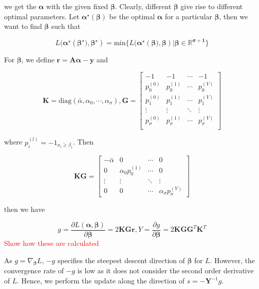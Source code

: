 we get the $\boldsymbol{\alpha}$ with the given fixed $\boldsymbol{\beta}$. Clearly, different $\boldsymbol{\beta}$ give rise to different optimal parameters. Let $\boldsymbol{\alpha^\star}(\boldsymbol{\beta})$ be the optimal $\boldsymbol{\alpha}$ for a particular $\boldsymbol{\beta}$, then we want to find $\boldsymbol{\beta}$ such that


\begin{equation}
	L(\boldsymbol{\alpha^\star}(\boldsymbol{\beta^\star)}, \boldsymbol{\beta^\star})=\text{min}\{L(\boldsymbol{\alpha^\star}(\boldsymbol{\beta)}, \boldsymbol{\beta}) | \boldsymbol{\beta\in\mathbb{R}^{\sigma+1}}\}
\end{equation}

For $\boldsymbol{\beta}$, we define $\boldsymbol{r}=\boldsymbol{A\alpha-y}$ and 

$$
\boldsymbol{K}=\text{diag}(\bar{\alpha},\alpha_0, \cdots, \alpha_\sigma), \boldsymbol{G}=\begin{bmatrix}
 -1 & -1 & \cdots & -1 \\
  p_0^{(0)} & p_0^{(1)} & \cdots & p_0^{(V)} \\
  p_1^{(0)} & p_1^{(1)} & \cdots & p_1^{(V)} \\
  \vdots & \vdots & \ddots & \vdots \\
  p_\sigma^{(0)} & p_\sigma^{(1)}& \cdots & p_\sigma^{(V)} \\
\end{bmatrix}
$$

where $p_i^{(l)}=-1_{x_l\geq \beta_i}$. Then

$$
\boldsymbol{KG}=\begin{bmatrix}
 -\bar{\alpha} & 0 & \cdots & 0 \\
 0 & \alpha_0p_0^{(1)} & \cdots  & 0 \\
 \vdots & \vdots & \ddots & \vdots \\
 0 & 0 & \cdots & \alpha_\sigma p_\sigma^{(V)}
\end{bmatrix}
$$

then we have 

\begin{equation}
	g=\frac{\partial L(\boldsymbol{\alpha},\boldsymbol{\beta})}{\partial \boldsymbol{\beta}}=2\boldsymbol{KGr},
	Y=\frac{\partial g}{\partial \boldsymbol{\beta}}=2\boldsymbol{KGG}^T \boldsymbol{K}^T
\end{equation}
\textcolor{red}{Show how these are calculated}

As $g=\nabla_{\boldsymbol{\beta}} L$, $-g$ specifies the steepest descent direction of $\boldsymbol{\beta}$ for $L$. However, the convergence rate of $-g$ is low as it does not consider the second order derivative of $L$. Hence, we perform the update along the direction of $s=-\boldsymbol{Y}^{-1}g$.

